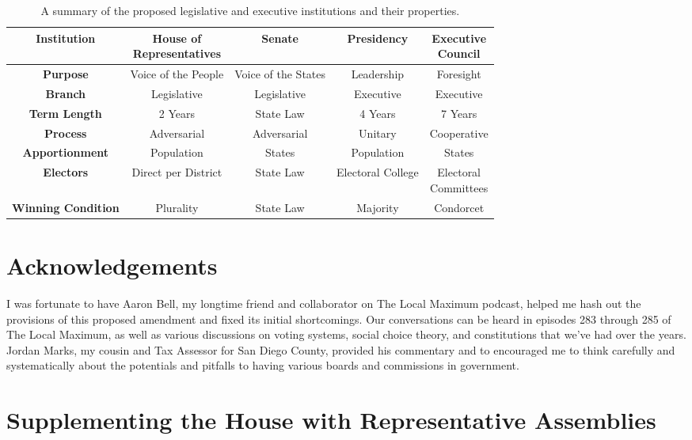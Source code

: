 \documentclass{article}
\begin{document}
\begin{table}[ht]
\centering
\renewcommand{\arraystretch}{1.5}
\begin{tabular}{|c|c|c|c|c|}
\hline
\textbf{Institution} & \makecell{House of \\ Representatives} & Senate & Presidency & \makecell{Executive \\ Council}  \\
\hline
\textbf{Purpose} & Voice of the People & Voice of the States & Leadership & Foresight \\
\hline
\textbf{Branch} & Legislative & Legislative & Executive & Executive \\
\hline
\textbf{Term Length} & 2 Years & State Law & 4 Years & 7 Years \\
\hline
\textbf{Process} & Adversarial & Adversarial & Unitary & Cooperative \\
\hline
\textbf{Apportionment} & Population & States & Population & States  \\
\hline
\textbf{Electors} & Direct per District & State Law  & Electoral College & \makecell{Electoral\\Committees}  \\
\hline
\textbf{Winning Condition} & Plurality & State Law & Majority & Condorcet  \\
\hline
\end{tabular}
\caption{A summary of the proposed legislative and executive institutions and their properties. }
\label{table:institutions}
\end{table}

\section*{Acknowledgements}

I was fortunate to have Aaron Bell, my longtime friend and collaborator on The Local Maximum podcast, helped me hash out the provisions of this proposed amendment and fixed its initial shortcomings. Our conversations can be heard in episodes 283 through 285 of The Local Maximum, as well as various discussions on voting systems, social choice theory, and constitutions that we've had over the years. Jordan Marks, my cousin and Tax Assessor for San Diego County, provided his commentary and to encouraged me to think carefully and systematically about the potentials and pitfalls to having various boards and commissions in government.

\appendix
\section{Supplementing the House with Representative Assemblies}
\label{appendix:house}
\end{document}
